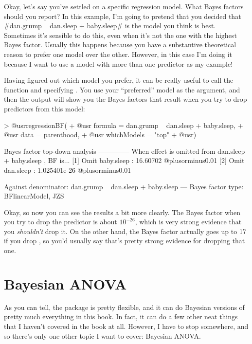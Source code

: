 
Okay, let's say you've settled on a specific regression model. What Bayes factors should you report? In this example, I'm going to pretend that you decided that \rtextverb#dan.grump ~ dan.sleep + baby.sleep# is the model you think is best. Sometimes it's sensible to do this, even when it's not the one with the highest Bayes factor. Usually this happens because you have a substantive theoretical reason to prefer one model over the other. However, in this case I'm doing it because I want to use a model with more than one predictor as my example! 

Having figured out which model you prefer, it can be really useful to call the  function and specifying  . You use your ``preferred'' model as the  argument, and then the output will show you the Bayes factors that result when you try to drop predictors from this model:
\begin{rblock1}
> @usr{regressionBF( }
+ @usr{  formula = dan.grump ~ dan.sleep + baby.sleep,}
+ @usr{  data = parenthood,}
+ @usr{  whichModels = "top"}
+ @usr{)}

Bayes factor top-down analysis
--------------
When effect is omitted from dan.sleep + baby.sleep , BF is...
[1] Omit baby.sleep : 16.60702     @plusorminus0.01%
[2] Omit dan.sleep  : 1.025401e-26 @plusorminus0.01%

Against denominator:
  dan.grump ~ dan.sleep + baby.sleep 
---
Bayes factor type: BFlinearModel, JZS
\end{rblock1}
Okay, so now you can see the results a bit more clearly. The Bayes factor when you try to drop the  predictor is about $10^{-26}$, which is very strong evidence that you {\it shouldn't} drop it. On the other hand, the Bayes factor actually goes up to 17 if you drop , so you'd usually say that's pretty strong evidence for dropping that one.

\section{Bayesian ANOVA~\label{sec:bayesanova}}

As you can tell, the  package is pretty flexible, and it can do Bayesian versions of pretty much everything in this book. In fact, it can do a few other neat things that I haven't covered in the book at all. However, I have to stop somewhere, and so there's only one other topic I want to cover: Bayesian ANOVA. 

